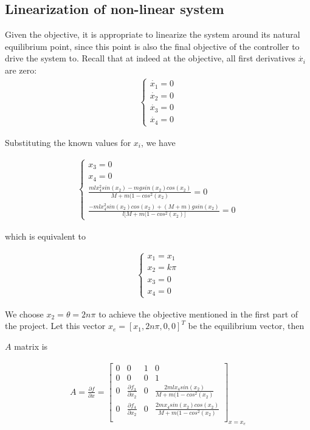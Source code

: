 \documentclass [12pt,letterpaper]{exam}
\begin{document}
\subsection{Linearization of non-linear system}
Given the objective, it is appropriate to linearize the system around its natural equilibrium point, since this point is also the final objective of the controller to drive the system to. Recall that at indeed at the objective, all first derivatives $\dot{x_i}$ are zero:
\begin{align}
\begin{cases}
\dot{x_1} = 0 \\
\dot{x_2} = 0 \\
\dot{x_3} = 0 \\
\dot{x_4} = 0
\end{cases}
\end{align}

Substituting the known values for $x_i$, we have

\begin{align}
\begin{cases}
x_3 = 0 \\
x_4 = 0 \\
\frac{mlx_4^2sin(x_2) - mgsin(x_2)cos(x_2)}{M + m(1 - cos^{2}(x_2)} = 0 \\
\frac{-mlx_4^2sin(x_2)cos(x_2) + (M + m)gsin(x_2)}{l\big[M + m(1 - cos^{2}(x_2)\big]} = 0
\end{cases}
\end{align}

which is equivalent to

\begin{align}
\begin{cases}
x_1 = x_1 \\
x_2 = k\pi \\
x_3 = 0 \\
x_4 = 0
\end{cases}
\end{align}

We choose $x_2 = \theta = 2n\pi$ to achieve the objective mentioned in the first part of the project. Let this vector $x_e = [x_1, 2n\pi, 0, 0]^T$ be the equilibrium vector, then

$A$ matrix is 

\begin{align}
A = \frac{\partial f}{\partial x} =
\begin{bmatrix}
0 & 0 & 1 & 0 \\
0 & 0 & 0 & 1 \\
0 & \frac{\partial f_3}{\partial x_2} & 0 & \frac{2mlx_4sin(x_2)}{M + m(1 - cos^{2}(x_2)} \\
0 & \frac{\partial f_4}{\partial x_2} & 0 & \frac{2mx_4sin(x_2)cos(x_2)}{M + m(1 - cos^{2}(x_2)} \\
\end{bmatrix}_{x = x_e}
\end{align}
\end{document}

